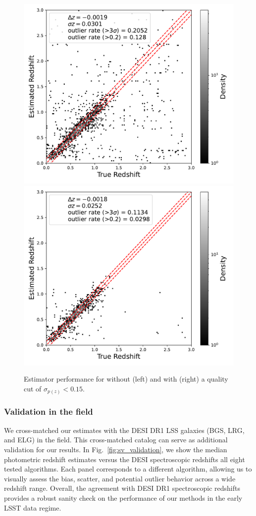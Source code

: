 \begin{figure}
    \centering
    \includegraphics[width=0.45\linewidth]{figures/tpz_scatter_orig.pdf}
    \includegraphics[width=0.45\linewidth]{figures/tpz_scatter_clean.pdf} \\
    \caption{Estimator performance for  without (left) and with (right) a quality cut of $\sigma_{p(z)} < 0.15$.}
    \label{fig:scatter_quality_cut}
\end{figure}


\subsubsection{Validation in the  field}

We cross-matched our \photoz estimates with the DESI DR1 LSS galaxies (BGS, LRG, and ELG) in the  field. This cross-matched catalog can serve as additional validation for our \photoz results.  In Fig.~\ref{fig:sv_validation}, we show the median photometric redshift estimates versus the DESI spectroscopic redshifts all eight tested \photoz algorithms.  Each panel corresponds to a different algorithm, allowing us to visually assess the bias, scatter, and potential outlier behavior across a wide redshift range. Overall, the agreement with DESI DR1 spectroscopic redshifts provides a robust sanity check on the performance of our methods in the early LSST data regime.

